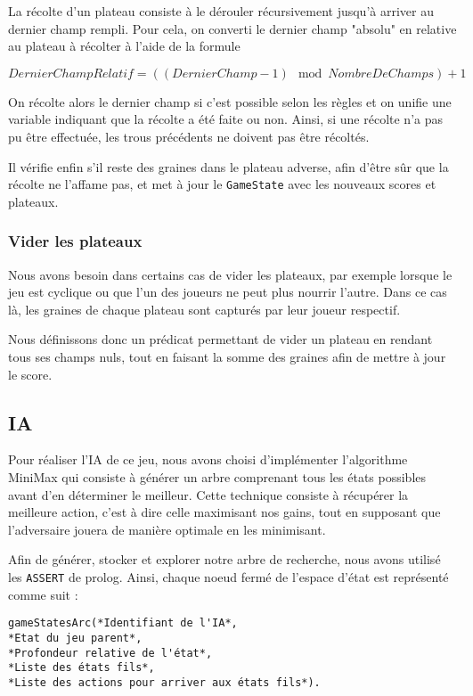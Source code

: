 \documentclass[]{article}
\begin{document}
La récolte d'un plateau consiste à le dérouler récursivement jusqu'à arriver au dernier champ rempli. Pour cela, on converti le dernier champ "absolu" en relative au plateau à récolter à l'aide de la formule

$$DernierChampRelatif = ((DernierChamp-1) \mod NombreDeChamps) + 1$$

On récolte alors le dernier champ si c'est possible selon les règles et on unifie une variable indiquant que la récolte a été faite ou non. Ainsi, si une récolte n'a pas pu être effectuée, les trous précédents ne doivent pas être récoltés.


Il vérifie enfin s'il reste des graines dans le plateau adverse, afin d'être sûr que la récolte ne l'affame pas, et met à jour le \texttt{GameState} avec les nouveaux scores et plateaux. 


\subsubsection{Vider les plateaux}

Nous avons besoin dans certains cas de vider les plateaux, par exemple lorsque le jeu est cyclique ou que l'un des joueurs ne peut plus nourrir l'autre. Dans ce cas là, les graines de chaque plateau sont capturés par leur joueur respectif.

Nous définissons donc un prédicat permettant de vider un plateau en rendant tous ses champs nuls, tout en faisant la somme des graines afin de mettre à jour le score. 

\subsection{IA}

Pour réaliser l'IA de ce jeu, nous avons choisi d'implémenter l'algorithme MiniMax qui consiste à générer un arbre comprenant tous les états possibles avant d'en déterminer le meilleur. Cette technique consiste à récupérer la meilleure action, c'est à dire celle maximisant nos gains, tout en supposant que l'adversaire jouera de manière optimale en les minimisant.

Afin de générer, stocker et explorer notre arbre de recherche, nous avons utilisé les \texttt{ASSERT} de prolog. Ainsi, chaque noeud fermé de l'espace d'état est représenté comme suit :

\begin{verbatim}
gameStatesArc(*Identifiant de l'IA*, 
*Etat du jeu parent*, 
*Profondeur relative de l'état*, 
*Liste des états fils*, 
*Liste des actions pour arriver aux états fils*).
\end{verbatim}
	
\end{document}
